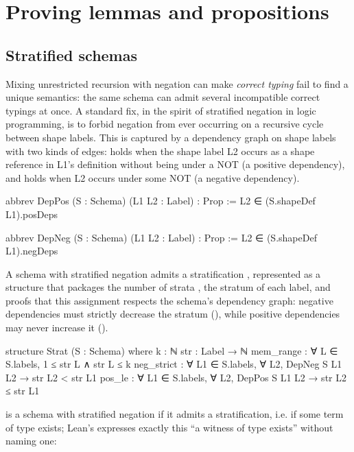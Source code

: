 \section{Proving lemmas and propositions} \label{sec:lemmas_proofs}

\subsection{Stratified schemas}

Mixing unrestricted recursion with negation can make \emph{correct typing} 
 fail to find a unique semantics: 
 the same schema can admit several incompatible correct typings at once. 
 A standard fix, in the spirit of stratified negation in logic programming, 
 is to forbid negation from ever occurring on a recursive cycle 
 between shape labels. 
 This is captured by a dependency graph on shape labels with two kinds 
 of edges:  holds when the shape label L2 occurs 
 as a shape reference in L1's definition without being under a NOT (a positive dependency), 
 and  holds when L2 occurs under some NOT (a negative dependency).

\begin{leanlisting}
abbrev DepPos (S : Schema) (L1 L2 : Label) : Prop := L2 ∈ (S.shapeDef L1).posDeps

abbrev DepNeg (S : Schema) (L1 L2 : Label) : Prop := L2 ∈ (S.shapeDef L1).negDeps
\end{leanlisting}

A schema with stratified negation admits a stratification , 
 represented as a structure that packages the number of strata , 
 the stratum  of each label, 
 and proofs that this assignment respects the schema's dependency graph: 
 negative dependencies must strictly decrease the stratum (), 
 while positive dependencies may never increase it ().

\begin{leanlisting}
structure Strat (S : Schema) where
  k : ℕ
  str : Label → ℕ
  mem_range : ∀ L ∈ S.labels, 1 ≤ str L ∧ str L ≤ k
  neg_strict : ∀ L1 ∈ S.labels, ∀ L2, DepNeg S L1 L2 →
                 str L2 < str L1
  pos_le : ∀ L1 ∈ S.labels, ∀ L2, DepPos S L1 L2 →
                 str L2 ≤ str L1
\end{leanlisting}

 is a schema with stratified negation if it admits a stratification,
 i.e. if some term of type  exists; Lean's 
 expresses exactly this ``a witness of type  exists'' without
 naming one:

